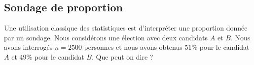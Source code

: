
\subsection{Sondage de proportion}

Une utilisation classique des statistiques est d'interpréter une proportion donnée par un sondage. Nous considérons une élection avec deux candidats \( A\) et \( B\). Nous avons interrogés \( n=2500\) personnes et nous avons obtenus \( 51\%\) pour le candidat \( A\) et \( 49\%\) pour le candidat \( B\). Que peut on dire ?

